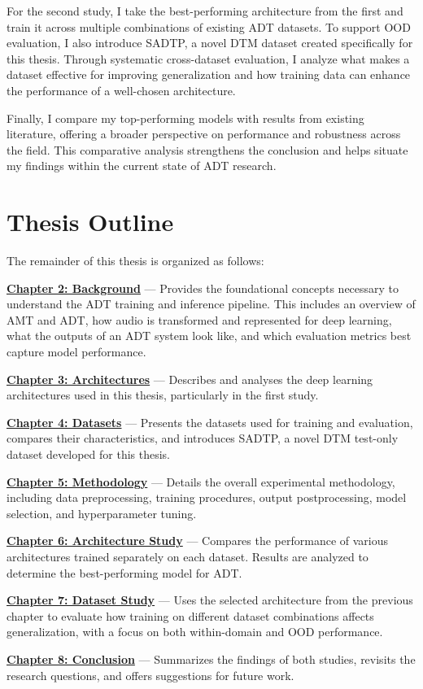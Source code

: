 For the second study, I take the best-performing architecture from the first and train it across multiple combinations of existing \gls{ADT} datasets. To support \acrfull{OOD} evaluation, I also introduce SADTP, a novel \gls{DTM} dataset created specifically for this thesis. Through systematic cross-dataset evaluation, I analyze what makes a dataset effective for improving generalization and how training data can enhance the performance of a well-chosen architecture.

Finally, I compare my top-performing models with results from existing literature, offering a broader perspective on performance and robustness across the field. This comparative analysis strengthens the conclusion and helps situate my findings within the current state of \gls{ADT} research.

\section{Thesis Outline}

The remainder of this thesis is organized as follows:

\noindent \hyperref[Background]{\textbf{Chapter 2: Background}} — Provides the foundational concepts necessary to understand the \gls{ADT} training and inference pipeline. This includes an overview of \gls{AMT} and \gls{ADT}, how audio is transformed and represented for deep learning, what the outputs of an \gls{ADT} system look like, and which evaluation metrics best capture model performance.

\noindent \hyperref[Architectures]{\textbf{Chapter 3: Architectures}} — Describes and analyses the deep learning architectures used in this thesis, particularly in the first study.

\noindent \hyperref[Datasets]{\textbf{Chapter 4: Datasets}} — Presents the datasets used for training and evaluation, compares their characteristics, and introduces SADTP, a novel \gls{DTM} test-only dataset developed for this thesis.

\noindent \hyperref[Methodology]{\textbf{Chapter 5: Methodology}} — Details the overall experimental methodology, including data preprocessing, training procedures, output postprocessing, model selection, and hyperparameter tuning.

\noindent \hyperref[Study1]{\textbf{Chapter 6: Architecture Study}} — Compares the performance of various architectures trained separately on each dataset. Results are analyzed to determine the best-performing model for \gls{ADT}.

\noindent \hyperref[Study2]{\textbf{Chapter 7: Dataset Study}} — Uses the selected architecture from the previous chapter to evaluate how training on different dataset combinations affects generalization, with a focus on both within-domain and \acrfull{OOD} performance.

\noindent \hyperref[Conclusion]{\textbf{Chapter 8: Conclusion}} — Summarizes the findings of both studies, revisits the research questions, and offers suggestions for future work.